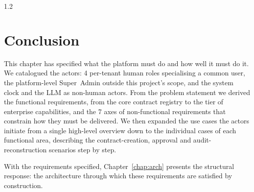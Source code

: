 \begin{spacing}{1.2}
\section*{Conclusion}
This chapter has specified what the platform must do and how well it
must do it. We catalogued the actors: 4 per-tenant human roles
specialising a common user, the platform-level Super~Admin outside this
project's scope, and the system clock and the LLM as non-human actors.
From the problem statement we derived the functional requirements, from
the core contract registry to the tier of enterprise capabilities, and
the 7 axes of non-functional requirements that constrain how they
must be delivered. We then expanded the use cases the actors initiate
from a single high-level overview down to the individual cases of each
functional area, describing the contract-creation, approval and
audit-reconstruction scenarios step by step.

With the requirements specified, Chapter~\ref{chap:arch} presents the
structural response: the architecture through which these requirements
are satisfied by construction.

\end{spacing}
